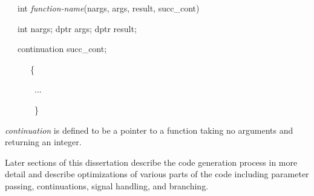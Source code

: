 {\ttfamily\mdseries
\ \ \ int \textit{function-name}(nargs, args, result, succ\_cont)}

{\ttfamily\mdseries
\ \ \ int nargs; dptr args; dptr result;}

{\ttfamily\mdseries
\ \ \ continuation succ\_cont;}

{\ttfamily\mdseries
\ \ \ \ \ \ \{}

{\ttfamily\mdseries
\ \ \ \ \ \ \ ...}

{\ttfamily\mdseries
\ \ \ \ \ \ \ \}}


\textit{continuation} is defined to be a pointer to a function taking
no arguments and returning an integer.

Later sections of this dissertation describe the code generation
process in more detail and describe optimizations of various parts of
the code including parameter passing, continuations, signal handling,
and branching.


\bigskip

\clearpage
\bigskip
